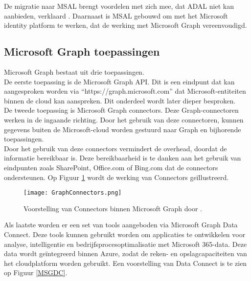 De migratie naar \ac{MSAL} brengt voordelen met zich mee, dat \ac{ADAL} niet kan aanbieden, verklaard \autocite{Microsoft2023m}. Daarnaast is \ac{MSAL} gebouwd om met het Microsoft identity platform te werken, dat de werking met Microsoft Graph vereenvoudigd.



\subsection{Microsoft Graph toepassingen}

Microsoft Graph bestaat uit drie toepassingen. \\

De eerste toepassing is de Microsoft Graph \Ac{API}. Dit is een eindpunt dat kan aangesproken worden via “https://graph.microsoft.com” dat Microsoft-entiteiten binnen de cloud kan aanspreken. Dit onderdeel wordt later dieper besproken. \\

De tweede toepassing is Microsoft Graph connectors. Deze Graph-connectoren werken in de ingaande richting. Door het gebruik van deze connectoren, kunnen gegevens buiten de Microsoft-cloud worden gestuurd naar Graph en bijhorende toepassingen. \\

Door het gebruik van deze connectors vermindert de overhead, doordat de informatie bereikbaar is. Deze bereikbaarheid is te danken aan het gebruik van eindpunten zoals SharePoint, Office.com of Bing.com dat de connectors ondersteunen. Op Figuur \ref{MSGC} wordt de werking van Connectors geïllustreerd. \\

\begin{figure}[!h]
    \texttt{[image: GraphConnectors.png]}
    \caption[Voorbeeld Microsoft Graph Connectors]{Voorstelling van Connectors binnen Microsoft Graph door \textcite{Hay2021}.}
    \label{MSGC}
\end{figure}

Als laatste worden er een set van tools aangeboden via Microsoft Graph Data Connect. Deze tools kunnen gebruikt worden om applicaties te ontwikkelen voor analyse, intelligentie en bedrijfsprocesoptimalisatie met Microsoft 365-data. Deze data wordt geïntegreerd binnen Azure, zodat de reken- en opslagcapaciteiten van het cloudplatform worden gebruikt. Een voorstelling van Data Connect is te zien op Figuur \ref{MSGDC}. \\

